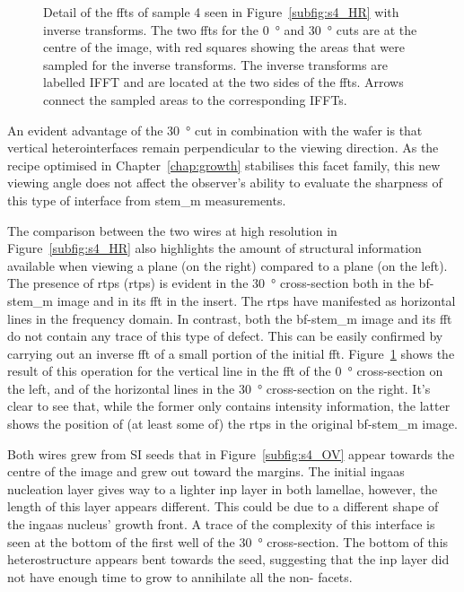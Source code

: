 \begin{figure}
    \caption[Detail of the \acs{fft}s of sample 4 with inverse transforms.]{Detail of the \acs{fft}s of sample 4 seen in Figure~\ref{subfig:s4_HR} with inverse transforms. The two \acs{fft}s for the \qty{0}{\degree} and \qty{30}{\degree} cuts are at the centre of the image, with red squares showing the areas that were sampled for the inverse transforms. The inverse transforms are labelled IFFT and are located at the two sides of the \acs{fft}s. Arrows connect the sampled areas to the corresponding IFFTs.}
    \label{fig:FFT_analysis}
\end{figure}

An evident advantage of the \qty{30}{\degree} cut in combination with the  wafer is that vertical  heterointerfaces remain perpendicular to the viewing direction. As the recipe optimised in Chapter~\ref{chap:growth} stabilises this facet family, this new viewing angle does not affect the observer's ability to evaluate the sharpness of this type of interface from \acs{stem_m} measurements.

The comparison between the two wires at high resolution in Figure~\ref{subfig:s4_HR} also highlights the amount of structural information available when viewing a  plane (on the right) compared to a  plane (on the left). The presence of \acl{rtp}s (\acs{rtp}s) is evident in the \qty{30}{\degree} cross-section both in the \acs{bf}-\acs{stem_m} image and in its \acf{fft} in the insert. The \acs{rtp}s have manifested as horizontal lines in the frequency domain. In contrast, both the  \acs{bf}-\acs{stem_m} image and its \acf{fft} do not contain any trace of this type of defect. This can be easily confirmed by carrying out an inverse \acs{fft} of a small portion of the initial \acs{fft}. Figure~\ref{fig:FFT_analysis} shows the result of this operation for the vertical line in the \acs{fft} of the \qty{0}{\degree} cross-section on the left, and of the horizontal lines in the \qty{30}{\degree} cross-section on the right. It's clear to see that, while the former only contains intensity information, the latter shows the position of (at least some of) the \acs{rtp}s in the original \acs{bf}-\acs{stem_m} image.

Both wires grew from \acl{SI} seeds that in Figure~\ref{subfig:s4_OV} appear towards the centre of the image and grew out toward the margins. The initial \acs{ingaas} nucleation layer gives way to a lighter \acs{inp} layer in both lamellae, however, the length of this layer appears different. This could be due to a different shape of the \acs{ingaas} nucleus' growth front. A trace of the complexity of this interface is seen at the bottom of the first well of the \qty{30}{\degree} cross-section. The bottom of this heterostructure appears bent towards the seed, suggesting that the \acs{inp} layer did not have enough time to grow to annihilate all the non- facets.

